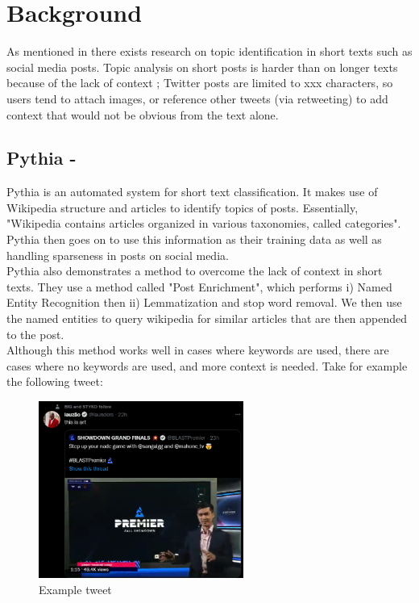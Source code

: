 \chapter{Background}
\label{ch:background}



As mentioned in  there exists research on topic identification in short texts such as social media posts.
Topic analysis on short posts is harder than on longer texts because of the lack of context \cite{}; Twitter posts are limited to xxx
characters, so users tend to attach images, or reference other tweets (via retweeting) to add context that would not be obvious from
the text alone.

\section{Pythia - \cite{Pythia}}
Pythia is an automated system for short text classification. It makes use of Wikipedia structure and articles to identify
topics of posts.
Essentially, "Wikipedia contains articles organized in various taxonomies, called categories". Pythia then goes on to use
this information as their training data as well as handling sparseness in posts on social media.\\

Pythia also demonstrates a method to overcome the lack of context in short texts. They use a method called "Post Enrichment",
which performs i) Named Entity Recognition then ii) Lemmatization and stop word removal. We then use the named entities to query
wikipedia for similar articles that are then appended to the post.\\

Although this method works well in cases where keywords are used, there are cases where no keywords are used, and more context
is needed. Take for example the following tweet:
\newpage
\begin{figure}[htbp]
    \centering
    \includegraphics[width=0.6\textwidth]{../images/tweet-example.png}
    \caption{Example tweet}
    \label{fig:tweet-example}
\end{figure}

